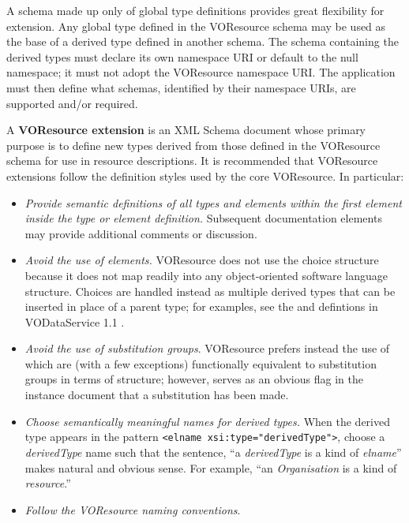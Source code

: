 \documentclass[11pt,a4paper]{ivoa}
\begin{document}
\label{sect:extending}

A schema made up only of global type definitions provides great
flexibility for extension.  Any global type defined in the VOResource
schema may be used as the base of a derived type defined in another
schema.  The schema containing the derived types must declare its own
namespace URI or default to the null namespace; it must not adopt the
VOResource namespace URI.  The application must then define what
schemas, identified by their namespace URIs, are supported and/or
required.



A \textbf{VOResource extension} is an XML Schema document whose primary
purpose is to define new types derived from those defined in the
VOResource schema for use in resource descriptions.  It is recommended
that VOResource extensions follow the definition styles used by the core
VOResource.  In particular:

\begin{itemize}
  \item \emph{Provide semantic definitions of all types and elements within
       the first  element inside
       the type or element definition.}  Subsequent
       documentation elements may provide
       additional comments or discussion.

  \item \emph{Avoid the use of  elements.}
       VOResource does not use the choice structure because it does
       not map readily into any object-oriented software language
       structure.  Choices are handled instead as multiple derived
       types that can be inserted in place of a parent type; for
       examples, see the  and
        defintions in VODataService 1.1
       \citep{2010ivoa.spec.1202P}. %

  \item \emph{Avoid the use of substitution groups}.  VOResource
       prefers instead the use of  which are
       (with a few exceptions) functionally equivalent to substitution
       groups in terms of structure; however, 
       serves as an obvious flag in the instance document that a
       substitution has been made.

  \item \emph{Choose semantically meaningful names for derived
       types.}  When the derived type appears in the pattern
       \verb|<elname xsi:type="derivedType">|,
       choose a \textit{derivedType} name such that the sentence, ``a
       \textit{derivedType} is a kind of \textit{elname}'' makes natural
       and obvious sense.  For example, ``an \textit{Organisation} is a
       kind of \textit{resource}.''

  \item \emph{Follow the VOResource naming conventions}.
\end{itemize}
\end{document}
